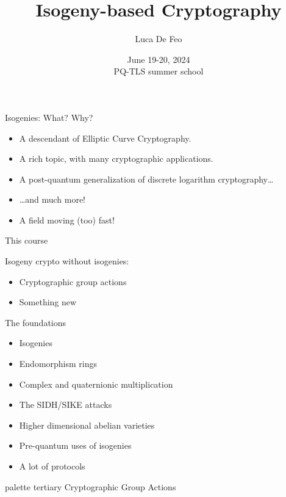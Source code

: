 \documentclass[aspectratio=169]{beamer}
\title{Isogeny-based Cryptography}
\author{Luca De Feo}
\date[June 19-20, 2024, PQ-TLS summer school]{June 19-20, 2024\\
  PQ-TLS summer school}
\institute{IBM Research Zürich}
\begin{document}
\frame[plain]{\titlepage}


\begin{frame}{Isogenies: What? Why?}
  \large
  \begin{itemize}
    \setlength{\itemsep}{2em}
  \item A descendant of Elliptic Curve Cryptography.
  \item A rich topic, with many cryptographic applications.
  \item A post-quantum generalization of discrete logarithm cryptography\dots
  \item \dots and much more!
  \item A field moving (too) fast!
  \end{itemize}
\end{frame}


\begin{frame}{This course}
  \begin{description}
    \setlength{\itemsep}{2em}
  \item[Today:] Isogeny crypto without isogenies:
    \begin{itemize}
    \item Cryptographic group actions
    \item Something new
    \end{itemize}
  \item[Tomorrow:] The foundations
    \begin{itemize}
    \item Isogenies
    \item Endomorphism rings
    \item Complex and quaternionic multiplication
    \end{itemize}
  \item[Not covered:]
    \begin{itemize}
    \item The SIDH/SIKE attacks
    \item Higher dimensional abelian varieties
    \item Pre-quantum uses of isogenies
    \item A lot of protocols
    \end{itemize}
  \end{description}
\end{frame}


\begin{frame}[plain]
  \begin{beamercolorbox}[sep=0.1px,center,wd=\paperwidth,sep=0.5\paperheight]{palette tertiary}
    \Huge\centering Cryptographic Group Actions
  \end{beamercolorbox}
\end{frame}
\end{document}
